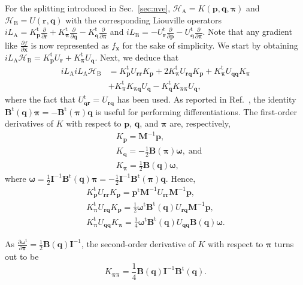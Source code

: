 \documentclass[
	aip,
	jcp,
	reprint,
]{revtex4-1}
\newcommand{\mt}[1]{\boldsymbol{\mathbf{#1}}}          %
\newcommand{\vt}[1]{\boldsymbol{\mathbf{#1}}}          %
\newcommand{\tr}[1]{#1^\text{t}}                       %
\newcommand{\diff}[2]{\frac{\partial #1}{\partial #2}} %
\newcommand{\Ham}[1]{{\mathcal H}_\text{#1}}           %
\newcommand{\Liu}[1]{i\!L_\text{#1}}                   %
\begin{document}
For the splitting introduced in Sec.~\ref{sec:nve}, $\Ham A = K(\vt p, \vt q, \vt \pi)$ and $\Ham B = U(\vt r, \vt q)$ with the corresponding Liouville operators $\Liu{A} = \tr{K_{\vt p}}\diff{}{\vt r} + \tr{K_{\vt \pi}}\diff{}{\vt q} - \tr{K_{\vt q}}\diff{}{\vt \pi}$ and $\Liu{B} = -\tr{U_{\vt r}}\diff{}{\vt p} - \tr{U_{\vt q}}\diff{}{\vt \pi}$.
Note that any gradient like $\diff{f}{\vt x}$ is now represented as $f_{\vt x}$ for the sake of simplicity.
We start by obtaining $\Liu A \Ham B = \tr{K_{\vt p}} U_{\vt r} + \tr{K_{\vt \pi}} U_{\vt q}$. Next, we deduce that
\begin{align*}
\Liu A \Liu A \Ham B &= \tr{K_{\vt p}} U_{\vt r \vt r} K_{\vt p}
+ 2 \tr{K_{\vt \pi}} U_{\vt r \vt q} K_{\vt p}
+ \tr{K_{\vt \pi}} U_{\vt q \vt q} K_{\vt \pi} \\
&+ \tr{K_{\vt \pi}} K_{\vt \pi \vt q} U_{\vt q}
- \tr{K_{\vt q}} K_{\vt \pi \vt \pi} U_{\vt q},
\end{align*}
where the fact that $\tr{U_{\vt q \vt r}} = U_{\vt r \vt q}$ has been used.
As reported in Ref.~, the identity $\tr{\mt B}(\vt q) {\vt \pi} = -\tr{\mt B}(\vt \pi) {\vt q}$ is useful for performing differentiations.
The first-order derivatives of $K$ with respect to $\vt p$, $\vt q$, and $\vt \pi$ are, respectively,
\begin{align*}
&K_{\vt p} = {\mt M}^{-1} {\vt p}, \\
&K_{\vt q} = -\frac{1}{2} {\mt B}(\vt \pi) {\vt \omega}, \; \text{and} \\
&K_{\vt \pi} = \frac{1}{2} {\mt B}(\vt q) {\vt \omega},
\end{align*}
where $\vt \omega = \frac{1}{2} {\mt I}^{-1} \tr{\mt B}(\vt q) \vt \pi = -\frac{1}{2} {\mt I}^{-1} \tr{\mt B}(\vt \pi) \vt q$.\cite{Silveira_2017} Hence,
\begin{gather*}
\tr{K_{\vt p}} U_{\vt r \vt r} K_{\vt p} = \tr{\vt p} {\mt M}^{-1} U_{\vt r \vt r} {\mt M}^{-1} {\vt p}, \\
\tr{K_{\vt \pi}} U_{\vt r \vt q} K_{\vt p} = \frac{1}{2} \tr{\vt \omega} \tr{\mt B}(\vt q) U_{\vt r \vt q} {\mt M}^{-1} {\vt p}, \\
\tr{K_{\vt \pi}} U_{\vt q \vt q} K_{\vt \pi} = \frac{1}{4} \tr{\vt \omega} \tr{\mt B}(\vt q) U_{\vt q \vt q} {\mt B}(\vt q) \vt \omega.
\end{gather*}

As $\diff{\tr{\vt \omega}}{\vt \pi} = \frac{1}{2} {\mt B}(\vt q) {\mt I}^{-1}$, the second-order derivative of $K$ with respect to $\vt \pi$ turns out to be
\begin{equation*}
K_{\vt \pi \vt \pi} = \frac{1}{4} {\mt B}(\vt q) {\mt I}^{-1} \tr{\mt B}(\vt q).
\end{equation*}
\end{document}
